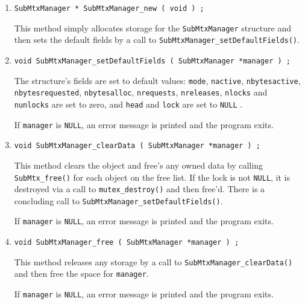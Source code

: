 \begin{enumerate}
\item
\begin{verbatim}
SubMtxManager * SubMtxManager_new ( void ) ;
\end{verbatim}
This method simply allocates storage 
for the {\tt SubMtxManager} structure 
and then sets the default fields by a call to 
{\tt SubMtxManager\_setDefaultFields()}.
\item
\begin{verbatim}
void SubMtxManager_setDefaultFields ( SubMtxManager *manager ) ;
\end{verbatim}
The structure's fields are set to default values:
{\tt mode}, 
{\tt nactive}, 
{\tt nbytesactive}, 
{\tt nbytesrequested}, 
{\tt nbytesalloc}, 
{\tt nrequests}, 
{\tt nreleases}, 
{\tt nlocks} and
{\tt nunlocks} are set to zero,
and {\tt head} and {\tt lock} are set to {\tt NULL} .
\par {}
If {\tt manager} is {\tt NULL},
an error message is printed and the program exits.
\item
\begin{verbatim}
void SubMtxManager_clearData ( SubMtxManager *manager ) ;
\end{verbatim}
This method clears the object and free's any owned data
by calling {\tt SubMtx\_free()} for each object on the free
list.
If the lock is not {\tt NULL}, it is destroyed via a call to
{\tt mutex\_destroy()} and then free'd.
There is a concluding call to 
{\tt SubMtxManager\_setDefaultFields()}.
\par {}
If {\tt manager} is {\tt NULL},
an error message is printed and the program exits.
\item
\begin{verbatim}
void SubMtxManager_free ( SubMtxManager *manager ) ;
\end{verbatim}
This method releases any storage by a call to 
{\tt SubMtxManager\_clearData()} 
and then free the space for {\tt manager}.
\par {}
If {\tt manager} is {\tt NULL},
an error message is printed and the program exits.
\end{enumerate}
\par
